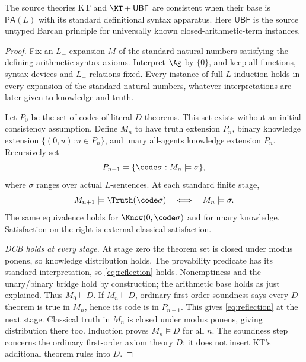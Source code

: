 \documentclass[11pt]{article}
\begin{document}
\begin{theorem}\label{thm:consistency}
The source theories KT and $\KT+\mathsf{UBF}$ are consistent when
their base is $\mathsf{PA}(L)$ with its standard definitional syntax
apparatus. Here $\mathsf{UBF}$ is the source untyped Barcan principle
for universally known closed-arithmetic-term instances.
\end{theorem}
\begin{proof}
Fix an $L_-$ expansion $M$ of the standard natural numbers satisfying
the defining arithmetic syntax axioms. Interpret $\Ag$ by $\{0\}$,
and keep all functions, syntax devices and $L_-$ relations fixed.
Every instance of full $L$-induction holds in every expansion of
the standard natural numbers, whatever interpretations are later given
to knowledge and truth.

Let $P_0$ be the set of codes of literal $D$-theorems. This set exists
without an initial consistency assumption. Define $M_n$ to have truth
extension $P_n$, binary knowledge extension $\{(0,u):u\in P_n\}$,
and unary all-agents knowledge extension $P_n$. Recursively set
\[
 P_{n+1}=\{\code\sigma:M_n\models\sigma\},
\]
where $\sigma$ ranges over actual $L$-sentences. At each standard
finite stage,
\begin{equation}\label{eq:revision}
 M_{n+1}\models\Truth(\code\sigma)
 \quad\Longleftrightarrow\quad M_n\models\sigma.
\end{equation}
The same equivalence holds for $\Know(0,\code\sigma)$ and for unary
knowledge. Satisfaction on the right is external classical satisfaction.

\emph{DCB holds at every stage.} At stage zero the theorem set is
closed under modus ponens, so knowledge distribution holds. The
provability predicate has its standard interpretation, so
\eqref{eq:reflection} holds. Nonemptiness and the unary/binary bridge
hold by construction; the arithmetic base holds as just explained.
Thus $M_0\models D$. If $M_n\models D$, ordinary first-order
soundness says every $D$-theorem is true in $M_n$, hence its code is
in $P_{n+1}$. This gives \eqref{eq:reflection} at the next stage.
Classical truth in $M_n$ is closed under modus ponens, giving
distribution there too. Induction proves $M_n\models D$ for all $n$.
The soundness step concerns the ordinary first-order axiom theory $D$;
it does not insert KT's additional theorem rules into $D$.


\end{proof}
\end{document}

